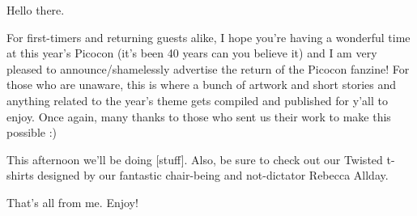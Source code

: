 Hello there.

For first-timers and returning guests alike, I hope you're having a wonderful time at this year's Picocon (it's been 40 years can you believe it) and I am very pleased to announce/shamelessly advertise the return of the Picocon fanzine! For those who are unaware, this is where a bunch of artwork and short stories and anything related to the year's theme gets compiled and published for y'all to enjoy. Once again, many thanks to those who sent us their work to make this possible :) 

This afternoon we'll be doing [stuff]. Also, be sure to check out our Twisted t-shirts designed by our fantastic chair-being and not-dictator Rebecca Allday.

That's all from me. Enjoy!
